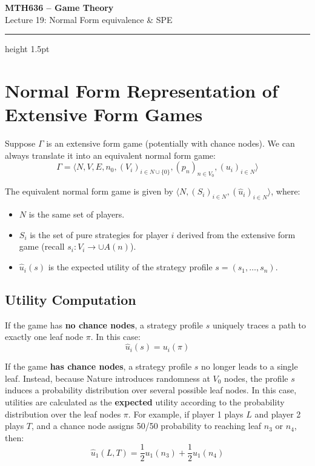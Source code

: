 \documentclass[12pt, a4paper]{article}
\begin{document}
\begin{center}
  {\LARGE\bfseries\sffamily\color{defblue} MTH636 -- Game Theory}\\[6pt]
  {\Large\sffamily Lecture 19: Normal Form equivalence \& SPE}\\[4pt]
\end{center}
\vspace{0.5cm}
\hrule height 1.5pt
\vspace{0.3cm}

\section{Normal Form Representation of Extensive Form Games}

Suppose $\Gamma$ is an extensive form game (potentially with chance nodes). We can always translate it into an equivalent normal form game:
\[ \Gamma = \langle N, V, E, n_0, (V_i)_{i \in N \cup \{0\}}, (p_n)_{n \in V_0}, (u_i)_{i \in N} \rangle \]

The equivalent normal form game is given by $\langle N, (S_i)_{i \in N}, (\hat{u}_i)_{i \in N} \rangle$, where:
\begin{itemize}
    \item $N$ is the same set of players.
    \item $S_i$ is the set of pure strategies for player $i$ derived from the extensive form game (recall $s_i : V_i \to \cup A(n)$).
    \item $\hat{u}_i(s)$ is the expected utility of the strategy profile $s = (s_1, \dots, s_n)$.
\end{itemize}

\subsection{Utility Computation}
If the game has \textbf{no chance nodes}, a strategy profile $s$ uniquely traces a path to exactly one leaf node $\pi$. In this case:
\[ \hat{u}_i(s) = u_i(\pi) \]

If the game \textbf{has chance nodes}, a strategy profile $s$ no longer leads to a single leaf. Instead, because Nature introduces randomness at $V_0$ nodes, the profile $s$ induces a probability distribution over several possible leaf nodes. 
In this case, utilities are calculated as the \textbf{expected} utility according to the probability distribution over the leaf nodes $\pi$.
For example, if player 1 plays $L$ and player 2 plays $T$, and a chance node assigns 50/50 probability to reaching leaf $n_3$ or $n_4$, then:
\[ \hat{u}_1(L, T) = \frac{1}{2}u_1(n_3) + \frac{1}{2}u_1(n_4) \]
\end{document}

